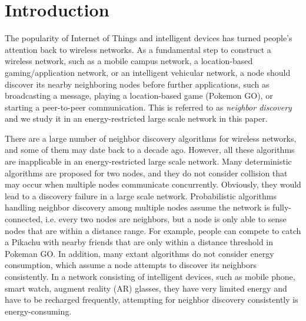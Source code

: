 \section{Introduction}






The popularity of Internet of Things and intelligent devices has turned people's attention back to wireless networks\cite{gupta2000capacity}. As a fundamental step to construct a wireless network, such as a mobile campus network, a location-based gaming/application network, or an intelligent vehicular network, a node should discover its nearby neighboring nodes before further applications, such as broadcasting a message, playing a location-based game (Pokemon GO), or starting a peer-to-peer communication. This is referred to as \emph{neighbor discovery} and we study it in an energy-restricted large scale network in this paper.

There are a large number of neighbor discovery algorithms for wireless networks, and some of them may date back to a decade ago.
However, all these algorithms are inapplicable in an energy-restricted large scale network. Many deterministic algorithms are proposed for two nodes\cite{dutta2008practical, kandhalu2010u, bakht2012searchlight, sun2014hello,  chen2015heterogeneous, wang2015blinddate, qiu2016talk}, and they do not consider collision that may occur when multiple nodes communicate concurrently. Obviously, they would lead to a discovery failure in a large scale network. Probabilistic algorithms handling neighbor discovery among multiple nodes\cite{mcglynn2001birthday, vasudevan2009neighbor, you2011aloha} assume the network is fully-connected, i.e. every two nodes are neighbors, but a node is only able to sense nodes that are within a distance range. For example, people can compete to catch a Pikachu with nearby friends that are only within a distance threshold in Pokeman GO. In addition, many extant algorithms do not consider energy consumption, which assume a node attempts to discover its neighbors consistently.
In a network consisting of intelligent devices, such as mobile phone, smart watch, augment reality (AR) glasses, they have very limited energy and have to be recharged frequently, attempting for neighbor discovery consistently is energy-consuming.

